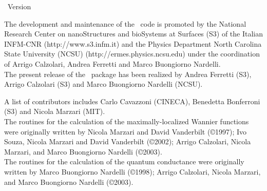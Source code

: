 
\thispagestyle{empty}
\begin{centering}
{\LARGE \WANT\ Version \WANTVERSION}\\
\end{centering}
\vspace{0.35in}

 The development and  maintenance of the
\WANT\ code is promoted by the National Research Center on
nanoStructures and bioSystems at Surfaces (S3) of the Italian
INFM-CNR (http://www.s3.infm.it) and the Physics Department North
Carolina State University (NCSU) (http://ermes.physics.ncsu.edu)
under the coordination of Arrigo Calzolari, Andrea Ferretti  and
Marco Buongiorno Nardelli.\\

\noindent The present release of the \WANT\ package has been
realized by Andrea Ferretti (S3), Arrigo Calzolari (S3) and Marco
Buongiorno Nardelli (NCSU).

\noindent A list of contributors includes Carlo Cavazzoni
(CINECA), Benedetta Bonferroni (S3) and Nicola Marzari (MIT). \\

\noindent The routines for the calculation of the
maximally-localized Wannier functions were originally written by
Nicola Marzari and David Vanderbilt (\copyright 1997);  Ivo Souza,
Nicola Marzari and David Vanderbilt (\copyright 2002); Arrigo
Calzolari, Nicola Marzari, and Marco Buongiorno Nardelli (\copyright 2003).\\

\noindent The routines for the calculation of the quantum
conductance were originally written by Marco Buongiorno Nardelli
(\copyright 1998); Arrigo Calzolari, Nicola Marzari, and
Marco Buongiorno Nardelli (\copyright 2003).\\
 \vspace{0.25in}

